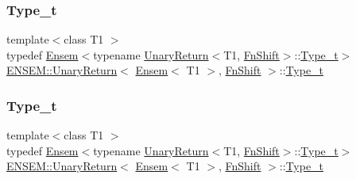 \subsubsection{\texorpdfstring{Type\_t}{Type\_t}\hspace{0.1cm}{\footnotesize\ttfamily [1/3]}}
{\footnotesize\ttfamily template$<$class T1 $>$ \\
typedef \mbox{\hyperlink{classENSEM_1_1Ensem}{Ensem}}$<$typename \mbox{\hyperlink{structENSEM_1_1UnaryReturn}{Unary\+Return}}$<$T1, \mbox{\hyperlink{structENSEM_1_1FnShift}{Fn\+Shift}}$>$\+::\mbox{\hyperlink{structENSEM_1_1UnaryReturn_3_01Ensem_3_01T1_01_4_00_01FnShift_01_4_aed1937a9071e7b8f1a036bdb1860c54d}{Type\+\_\+t}}$>$ \mbox{\hyperlink{structENSEM_1_1UnaryReturn}{E\+N\+S\+E\+M\+::\+Unary\+Return}}$<$ \mbox{\hyperlink{classENSEM_1_1Ensem}{Ensem}}$<$ T1 $>$, \mbox{\hyperlink{structENSEM_1_1FnShift}{Fn\+Shift}} $>$\+::\mbox{\hyperlink{structENSEM_1_1UnaryReturn_3_01Ensem_3_01T1_01_4_00_01FnShift_01_4_aed1937a9071e7b8f1a036bdb1860c54d}{Type\+\_\+t}}}

\mbox{\label{structENSEM_1_1UnaryReturn_3_01Ensem_3_01T1_01_4_00_01FnShift_01_4_aed1937a9071e7b8f1a036bdb1860c54d}} 
\subsubsection{\texorpdfstring{Type\_t}{Type\_t}\hspace{0.1cm}{\footnotesize\ttfamily [2/3]}}
{\footnotesize\ttfamily template$<$class T1 $>$ \\
typedef \mbox{\hyperlink{classENSEM_1_1Ensem}{Ensem}}$<$typename \mbox{\hyperlink{structENSEM_1_1UnaryReturn}{Unary\+Return}}$<$T1, \mbox{\hyperlink{structENSEM_1_1FnShift}{Fn\+Shift}}$>$\+::\mbox{\hyperlink{structENSEM_1_1UnaryReturn_3_01Ensem_3_01T1_01_4_00_01FnShift_01_4_aed1937a9071e7b8f1a036bdb1860c54d}{Type\+\_\+t}}$>$ \mbox{\hyperlink{structENSEM_1_1UnaryReturn}{E\+N\+S\+E\+M\+::\+Unary\+Return}}$<$ \mbox{\hyperlink{classENSEM_1_1Ensem}{Ensem}}$<$ T1 $>$, \mbox{\hyperlink{structENSEM_1_1FnShift}{Fn\+Shift}} $>$\+::\mbox{\hyperlink{structENSEM_1_1UnaryReturn_3_01Ensem_3_01T1_01_4_00_01FnShift_01_4_aed1937a9071e7b8f1a036bdb1860c54d}{Type\+\_\+t}}}

